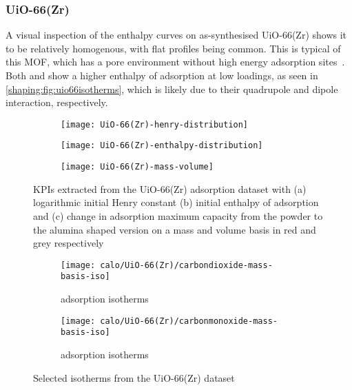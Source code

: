 
\subsubsection{UiO-66(Zr)}

A visual inspection of the enthalpy curves on as-synthesised UiO-66(Zr)
shows it to be relatively homogenous, with flat
profiles being common. This is typical of this \gls{MOF}, which has
a pore environment without high energy adsorption 
sites~\cite{wiersumEvaluationUiO66GasBased2011}.
Both  and  show a higher enthalpy of adsorption
at low loadings, as seen in \autoref{shaping:fig:uio66isotherms},
which is likely due to their quadrupole and dipole interaction,
respectively.

\begin{figure}[p!]
	\centering
	\begin{subfigure}{\linewidth}
		\parbox[c]{0.1\linewidth}{\caption{}%
			\label{shaping:fig:analysisuio66henry}}%
		\parbox[b]{0.8\linewidth}{%
			\texttt{[image: UiO-66(Zr)-henry-distribution]}%
		}%
	\end{subfigure}%

	\begin{subfigure}{\linewidth}
		\parbox[c]{0.1\linewidth}{\caption{}%
			\label{shaping:fig:analysisuio66enth}}%
		\parbox[b]{0.8\linewidth}{%
			\texttt{[image: UiO-66(Zr)-enthalpy-distribution]}%
		}%
	\end{subfigure}%

	\begin{subfigure}{\linewidth}
		\parbox[c]{0.1\linewidth}{\caption{}%
			\label{shaping:fig:analysisuio66basis}}%
		\parbox[b]{0.8\linewidth}{%
			\texttt{[image: UiO-66(Zr)-mass-volume]}%
		}%
	\end{subfigure}%

	\caption{\glspl{KPI} extracted from the UiO-66(Zr) adsorption dataset with
		(a) logarithmic initial Henry constant (b) initial enthalpy of
        adsorption and (c) change in adsorption maximum capacity from 
        the powder to the alumina shaped version on a mass and volume 
        basis in red and grey respectively}%
	\label{shaping:fig:analysisuio66}
\end{figure}

\begin{figure}[htb]
	\centering
	\begin{subfigure}{0.45\textwidth}
		\texttt{[image: calo/UiO-66(Zr)/carbondioxide-mass-basis-iso]}
		\caption{ adsorption isotherms}%
		\label{shaping:fig:uio66co2ads}
	\end{subfigure}%
	\begin{subfigure}{0.45\textwidth}
		\texttt{[image: calo/UiO-66(Zr)/carbonmonoxide-mass-basis-iso]}
		\caption{ adsorption isotherms}%
		\label{shaping:fig:uio66coads}
	\end{subfigure}%
	\caption{Selected isotherms from the UiO-66(Zr) dataset}%
	\label{shaping:fig:uio66isotherms}
\end{figure}

